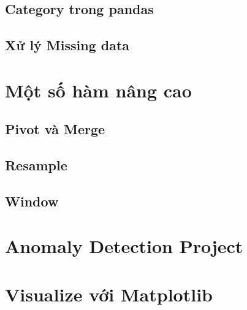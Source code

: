 \documentclass[
]{book}
\begin{document}
\hypertarget{category-trong-pandas}{%
\section{Category trong pandas}\label{category-trong-pandas}}

\hypertarget{xux1eed-luxfd-missing-data}{%
\section{Xử lý Missing data}\label{xux1eed-luxfd-missing-data}}

\hypertarget{mux1ed9t-sux1ed1-huxe0m-nuxe2ng-cao}{%
\chapter{Một số hàm nâng cao}\label{mux1ed9t-sux1ed1-huxe0m-nuxe2ng-cao}}

\hypertarget{pivot-vuxe0-merge}{%
\section{Pivot và Merge}\label{pivot-vuxe0-merge}}

\hypertarget{resample}{%
\section{Resample}\label{resample}}

\hypertarget{window}{%
\section{Window}\label{window}}

\hypertarget{anomaly-detection-project}{%
\chapter{Anomaly Detection Project}\label{anomaly-detection-project}}

\hypertarget{visualize-vux1edbi-matplotlib}{%
\chapter{Visualize với Matplotlib}\label{visualize-vux1edbi-matplotlib}}

  
\end{document}

